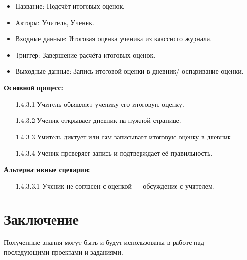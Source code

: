 \documentclass[a4paper, final]{article}
\begin{document}
\begin{itemize}
  \item Название: Подсчёт итоговых оценок.
  \item Акторы: Учитель, Ученик.
  \item Входные данные: Итоговая оценка ученика из классного журнала.
  \item Триггер: Завершение расчёта итоговых оценок.
  \item Выходные данные: Запись итоговой оценки в дневник/ оспаривание оценки.
\end{itemize}

\textbf{Основной процесс:}
\begin{enumerate}
  \item[1.4.3.1] Учитель объявляет ученику его итоговую оценку.
  \item[1.4.3.2] Ученик открывает дневник на нужной странице.
  \item[1.4.3.3] Учитель диктует или сам записывает итоговую оценку в дневник.
  \item[1.4.3.4] Ученик проверяет запись и подтверждает её правильность.
\end{enumerate}

\textbf{Альтернативные сценарии:}
\begin{itemize}
  \item[1.4.3.3.1] Ученик не согласен с оценкой --- обсуждение с учителем.
\end{itemize}

\newpage
\section*{Заключение}
Полученные знания могут быть и будут использованы в работе над последующими проектами и заданиями.

\cleardoublepage
{}
\newpage
\begin{thebibliography}{0}
\end{thebibliography}
\end{document}
